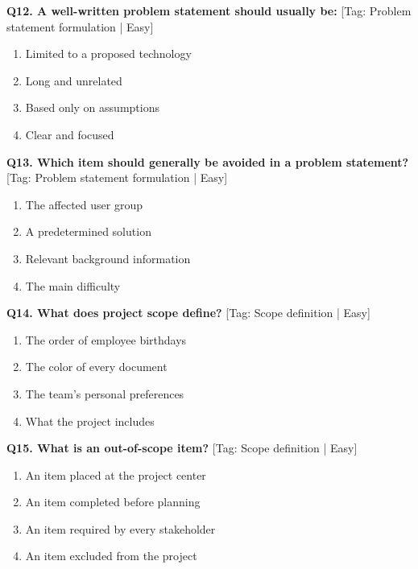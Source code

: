 \noindent\textbf{Q12. A well-written problem statement should usually be:} \hfill [Tag: Problem statement formulation | Easy]
\begin{enumerate}[label=(\alph*),topsep=2pt,itemsep=1pt,partopsep=0pt,parsep=0pt]
    \item {Limited to a proposed technology}
    \item {Long and unrelated}
    \item {Based only on assumptions}
    \item {Clear and focused}
\end{enumerate}
\vspace{2mm}

\noindent\textbf{Q13. Which item should generally be avoided in a problem statement?} \hfill [Tag: Problem statement formulation | Easy]
\begin{enumerate}[label=(\alph*),topsep=2pt,itemsep=1pt,partopsep=0pt,parsep=0pt]
    \item {The affected user group}
    \item {A predetermined solution}
    \item {Relevant background information}
    \item {The main difficulty}
\end{enumerate}
\vspace{2mm}

\noindent\textbf{Q14. What does project scope define?} \hfill [Tag: Scope definition | Easy]
\begin{enumerate}[label=(\alph*),topsep=2pt,itemsep=1pt,partopsep=0pt,parsep=0pt]
    \item {The order of employee birthdays}
    \item {The color of every document}
    \item {The team's personal preferences}
    \item {What the project includes}
\end{enumerate}
\vspace{2mm}

\noindent\textbf{Q15. What is an out-of-scope item?} \hfill [Tag: Scope definition | Easy]
\begin{enumerate}[label=(\alph*),topsep=2pt,itemsep=1pt,partopsep=0pt,parsep=0pt]
    \item {An item placed at the project center}
    \item {An item completed before planning}
    \item {An item required by every stakeholder}
    \item {An item excluded from the project}
\end{enumerate}
\vspace{2mm}


